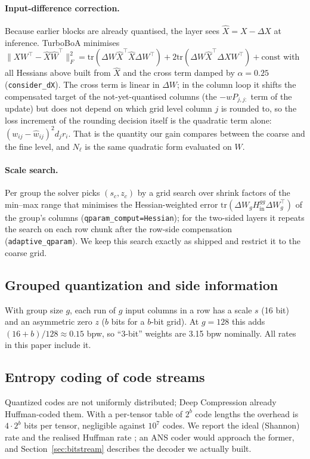 \documentclass{article}
\newcommand{\tr}{\mathrm{tr}}
\newcommand{\Hin}{H_{\mathrm{in}}}
\begin{document}
\paragraph{Input-difference correction.} Because earlier blocks are
already quantised, the layer sees $\hat X = X - \Delta X$ at inference.
TurboBoA minimises $\|XW^\top - \hat X\hat W^\top\|_F^2 = \tr(\Delta W
\hat X^\top\hat X\Delta W^\top) + 2\tr(\Delta W\hat X^\top\Delta X
W^\top) + \mathrm{const}$ with all Hessians above built from $\hat X$ and
the cross term damped by $\alpha = 0.25$ (\texttt{consider\_dX}). The
cross term is linear in $\Delta W$; in the column loop it shifts the
compensated target of the not-yet-quantised columns (the $-wP_{j,j:}$
term of the update) but does not depend on which grid level column $j$ is
rounded to, so the loss increment of the rounding decision itself is the
quadratic term alone: $(w_{ij} - \hat w_{ij})^2 d_j r_i$. That is the
quantity our gain compares between the coarse and the fine level, and
$N_\ell$ is the same quadratic form evaluated on $W$.

\paragraph{Scale search.} Per group the solver picks $(s_c, z_c)$ by a
grid search over shrink factors of the min--max range that minimises the
Hessian-weighted error $\tr(\Delta W_g \Hin^{gg}\Delta W_g^\top)$ of the
group's columns (\texttt{qparam\_comput=Hessian}); for the two-sided
layers it repeats the search on each row chunk after the row-side
compensation (\texttt{adaptive\_qparam}). We keep this search exactly as
shipped and restrict it to the coarse grid.

\subsection{Grouped quantization and side information}

With group size $g$, each run of $g$ input columns in a row has a scale
$s$ (16 bit) and an asymmetric zero $z$ ($b$ bits for a $b$-bit grid). At
$g{=}128$ this adds $(16+b)/128 \approx 0.15$ bpw, so ``3-bit'' weights
are 3.15 bpw nominally. All rates in this paper include it.

\subsection{Entropy coding of code streams}

Quantized codes are not uniformly distributed; Deep Compression
\citep{han2016deepcompression} already Huffman-coded them. With a
per-tensor table of $2^b$ code lengths the overhead is $4\cdot 2^b$ bits
per tensor, negligible against $10^7$ codes. We report the ideal
(Shannon) rate and the realised Huffman rate \citep{huffman1952}; an ANS
coder \citep{duda2013ans} would approach the former, and
Section~\ref{sec:bitstream} describes the decoder we actually built.
\end{document}
